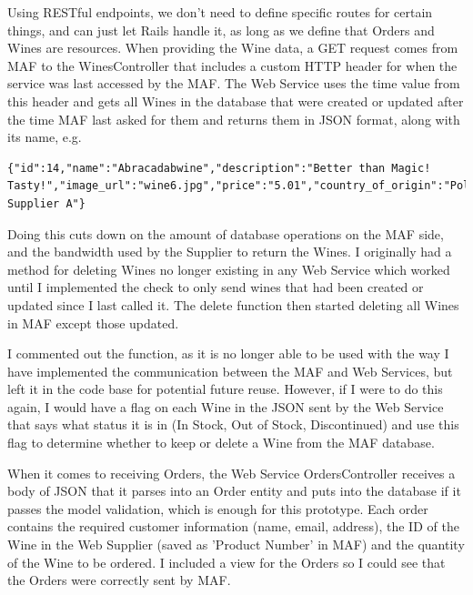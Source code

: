 \documentclass[12pt]{article}
\begin{document}
Using RESTful endpoints, we don't need to define specific routes for certain things, and can just let Rails handle it, as long as we define that Orders and Wines are resources. When providing the Wine data, a GET request comes from MAF to the WinesController that includes a custom HTTP header for when the service was last accessed by the MAF. The Web Service uses the time value from this header and gets all Wines in the database that were created or updated after the time MAF last asked for them and returns them in JSON format, along with its name, e.g.
\begin{lstlisting}
{"id":14,"name":"Abracadabwine","description":"Better than Magic! Tasty!","image_url":"wine6.jpg","price":"5.01","country_of_origin":"Poland","grape_type":"Green","suitable_for_vegetarians":true,"bottle_size":"350ml","url":"http://localhost:3001/wines/14.json","supplier":"Wine Supplier A"}
\end{lstlisting}

Doing this cuts down on the amount of database operations on the MAF side, and the bandwidth used by the Supplier to return the Wines. I originally had a method for deleting Wines no longer existing in any Web Service which worked until I implemented the check to only send wines that had been created or updated since I last called it. The delete function then started deleting all Wines in MAF except those updated.

I commented out the function, as it is no longer able to be used with the way I have implemented the communication between the MAF and Web Services, but left it in the code base for potential future reuse. However, if I were to do this again, I would have a flag on each Wine in the JSON sent by the Web Service that says what status it is in (In Stock, Out of Stock, Discontinued) and use this flag to determine whether to keep or delete a Wine from the MAF database.

When it comes to receiving Orders, the Web Service OrdersController receives a body of JSON that it parses into an Order entity and puts into the database if it passes the model validation, which is enough for this prototype. Each order contains the required customer information (name, email, address), the ID of the Wine in the Web Supplier (saved as 'Product Number' in MAF) and the quantity of the Wine to be ordered. I included a view for the Orders so I could see that the Orders were correctly sent by MAF.

\end{document}
